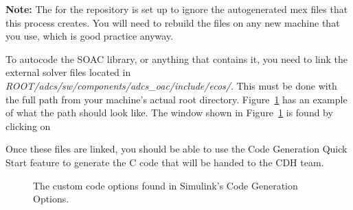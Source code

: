 \documentclass[10pt]{article}
\begin{document}
\textbf{Note:} The  for the repository is set up to ignore the autogenerated mex files that this process creates. You will need to rebuild the files on any new machine that you use, which is good practice anyway.

To autocode the SOAC library, or anything that contains it, you need to link the external solver files located in \textit{ROOT/adcs/sw/components/adcs\_oac/include/ecos/}. This must be done with the full path from your machine's actual root directory. Figure~\ref{fig:autocode} has an example of what the path should look like. The window shown in Figure~\ref{fig:autocode} is found by clicking on
\begin{center}
\end{center}
Once these files are linked, you should be able to use the Code Generation Quick Start feature to generate the C code that will be handed to the CDH team.

\begin{figure}[htb]
\centering
{} \vfil
{}
\caption{The custom code options found in Simulink's Code Generation Options.}
\label{fig:autocode}
\end{figure}
\end{document}
